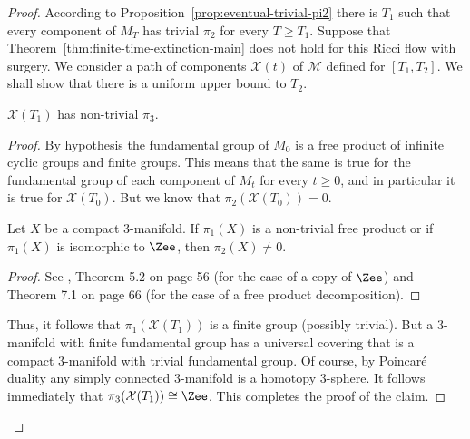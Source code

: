 \begin{proof}
 According to Proposition~\ref{prop:eventual-trivial-pi2} there is $T_1$ such that
every component of $M_T$ has trivial $\pi_2$ for every $T\ge T_1$.
Suppose that Theorem~\ref{thm:finite-time-extinction-main} does not hold for this Ricci flow
with surgery. We consider a path of components ${\mathcal X}(t)$ of
${\mathcal M}$ defined for $[T_1,T_2]$.  We shall show that there is
a uniform upper bound to $T_2$.

\begin{claim}
\label{claim:x-t1-nontrivial-pi3}
 ${\mathcal X}(T_1)$ has non-trivial $\pi_3$.
\end{claim}

\begin{proof}
By hypothesis the fundamental group of $M_0$ is a free product of
infinite cyclic groups and finite groups. This means that the same
is true for the fundamental group of each component of $M_t$ for
every $t\ge 0$, and in particular it is true for ${\mathcal
X}(T_0)$. But we know that $\pi_2({\mathcal X}(T_0))=0$.

\begin{claim}
\label{claim:free-product-implies-pi2-nonzero}
Let $X$ be a compact $3$-manifold. If $\pi_1(X)$ is a non-trivial
free product or if $\pi_1(X)$ is isomorphic to $\Zee$, then
$\pi_2(X)\not=0$.
\end{claim}


\begin{proof}
See \cite{Hempel}, Theorem 5.2 on page 56 (for the case of a copy of $\Zee$)
and \cite{Hempel} Theorem 7.1 on page 66 (for the case of a free product
decomposition).
\end{proof}

Thus, it follows that $\pi_1({\mathcal X}(T_1))$ is a finite group
(possibly trivial). But a $3$-manifold with finite fundamental group
has a universal covering that is a compact $3$-manifold with trivial
fundamental group. Of course, by Poincar\'e duality any simply
connected $3$-manifold  is a homotopy $3$-sphere. It follows
immediately that $\pi_3({\mathcal X}(T_1))\cong \Zee$. This
completes the proof of the claim.
\end{proof}



\end{proof}
